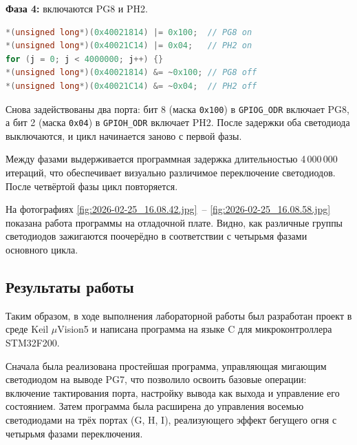 \textbf{Фаза 4:} включаются PG8 и PH2.

\begin{lstlisting}[language=C]
*(unsigned long*)(0x40021814) |= 0x100;  // PG8 on
*(unsigned long*)(0x40021C14) |= 0x04;   // PH2 on
for (j = 0; j < 4000000; j++) {}
*(unsigned long*)(0x40021814) &= ~0x100; // PG8 off
*(unsigned long*)(0x40021C14) &= ~0x04;  // PH2 off
\end{lstlisting}

Снова задействованы два порта: бит 8 (маска \texttt{0x100}) в \texttt{GPIOG\_ODR} включает PG8, а бит 2 (маска \texttt{0x04}) в \texttt{GPIOH\_ODR} включает PH2. После задержки оба светодиода выключаются, и цикл начинается заново с первой фазы.

Между фазами выдерживается программная задержка длительностью 4\,000\,000 итераций, что обеспечивает визуально различимое переключение светодиодов. После четвёртой фазы цикл повторяется.

На фотографиях \ref{fig:2026-02-25_16.08.42.jpg}~-- \ref{fig:2026-02-25_16.08.58.jpg} показана работа программы на отладочной плате. Видно, как различные группы светодиодов зажигаются поочерёдно в соответствии с четырьмя фазами основного цикла.


\subsection*{Результаты работы}

Таким образом, в ходе выполнения лабораторной работы был разработан проект в среде Keil $\mu$Vision5 и написана программа на языке C для микроконтроллера STM32F200.

Сначала была реализована простейшая программа, управляющая мигающим светодиодом на выводе PG7, что позволило освоить базовые операции: включение тактирования порта, настройку вывода как выхода и управление его состоянием. Затем программа была расширена до управления восемью светодиодами на трёх портах (G, H, I), реализующего эффект бегущего огня с четырьмя фазами переключения.
